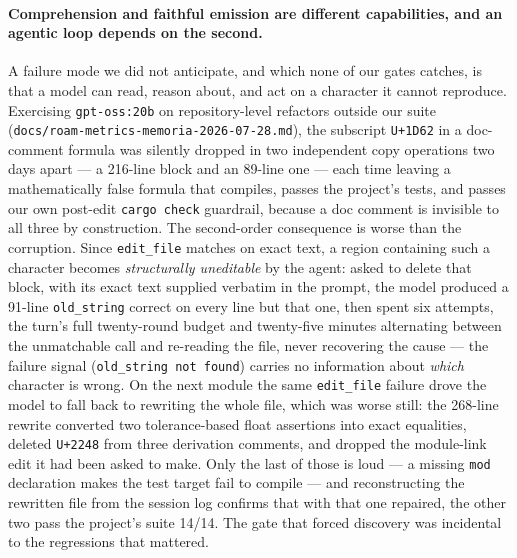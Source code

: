 \documentclass[smallcondensed,natbib]{svjour3}
\begin{document}
\paragraph{Comprehension and faithful emission are different
capabilities, and an agentic loop depends on the second.} A failure
mode we did not anticipate, and which none of our gates catches, is
that a model can read, reason about, and act on a character it cannot
reproduce. Exercising \texttt{gpt-oss:20b} on repository-level
refactors outside our suite (\texttt{docs/roam-metrics-memoria-2026-07-28.md}),
the subscript \texttt{U+1D62} in a doc-comment formula was silently
dropped in two independent copy operations two days apart --- a
216-line block and an 89-line one --- each time leaving a
mathematically false formula that compiles, passes the project's
tests, and passes our own post-edit \texttt{cargo check} guardrail,
because a doc comment is invisible to all three by construction. The
second-order consequence is worse than the corruption. Since
\texttt{edit\_file} matches on exact text, a region containing such a
character becomes \emph{structurally uneditable} by the agent: asked to
delete that block, with its exact text supplied verbatim in the prompt,
the model produced a 91-line \texttt{old\_string} correct on every line
but that one, then spent six attempts, the turn's full twenty-round
budget and twenty-five minutes alternating between the unmatchable call
and re-reading the file, never recovering the cause --- the failure
signal (\texttt{old\_string not found}) carries no information about
\emph{which} character is wrong. On the next module the same
\texttt{edit\_file} failure drove the model to fall back to rewriting
the whole file, which was worse still: the 268-line rewrite converted
two tolerance-based float assertions into exact equalities, deleted
\texttt{U+2248} from three derivation comments, and dropped the
module-link edit it had been asked to make. Only the last of those is
loud --- a missing \texttt{mod} declaration makes the test target fail
to compile --- and reconstructing the rewritten file from the session
log confirms that with that one repaired, the other two pass the
project's suite 14/14. The gate that forced discovery was incidental to
the regressions that mattered.
\end{document}
